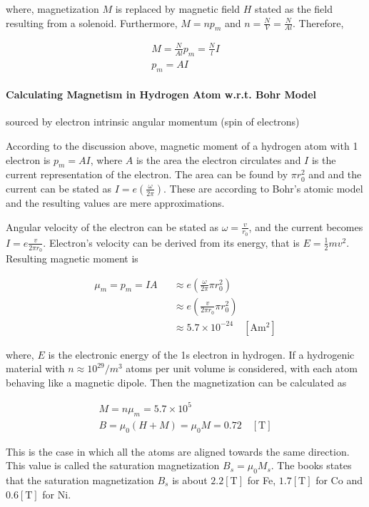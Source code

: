 where, magnetization $M$ is replaced by magnetic field $H$ stated as the field resulting from a solenoid. Furthermore, $M=np_{m}$ and $n=\frac{N}{V}=\frac{N}{Al}$. Therefore,

\begin{eqnarray}
	M = \frac{N}{Al} p_{m} = \frac{N}{l}I \\
	p_{m} = AI
\end{eqnarray}


\paragraph{Calculating Magnetism in Hydrogen Atom w.r.t. Bohr Model} sourced by electron intrinsic angular momentum (spin of electrons)

According to the discussion above, magnetic moment of a hydrogen atom with 1 electron is $p_{m} = AI$, where $A$ is the area the electron circulates and $I$ is the current representation of the electron. The area can be found by $\pi r_{0}^{2}$ and and the current can be stated as $I = e(\frac{\omega}{2 \pi})$. These are according to Bohr's atomic model and the resulting values are mere approximations.

Angular velocity of the electron can be stated as $\omega = \frac{v}{r_{0}}$, and the current becomes $I = e \frac{v}{2 \pi r_{0}}$. Electron's velocity can be derived from its energy, that is $E = \frac{1}{2}mv^{2}$. Resulting magnetic moment is

\begin{eqnarray}
	\mu_{m} = p_{m} = IA && \approx e(\frac{\omega}{2 \pi} \pi r_{0}^{2}) \\
	&& \approx e(\frac{v}{2 \pi r_{0}} \pi r_{0}^{2}) \\
	&& \approx 5.7 \times 10^{-24} \quad [\mathrm{Am^{2}}]
\end{eqnarray}

where, $E$ is the electronic energy of the 1s electron in hydrogen. If a hydrogenic material with $n \approx 10^{29}/m^{3}$ atoms per unit volume is considered, with each atom behaving like a magnetic dipole. Then the magnetization can be calculated as

\begin{eqnarray}
	M = n\mu_{m} = 5.7 \times 10^{5} \\
	B = \mu_{0} (H + M) = \mu_{0} M = 0.72 \quad [\mathrm{T}]
\end{eqnarray}

This is the case in which all the atoms are aligned towards the same direction. This value is called the saturation magnetization $B_{s} = \mu_{0} M_{s}$. The books states that the saturation magnetization $B_{s}$ is about $2.2[\mathrm{T}]$ for Fe, $1.7[\mathrm{T}]$ for Co and $0.6[\mathrm{T}]$ for Ni.


